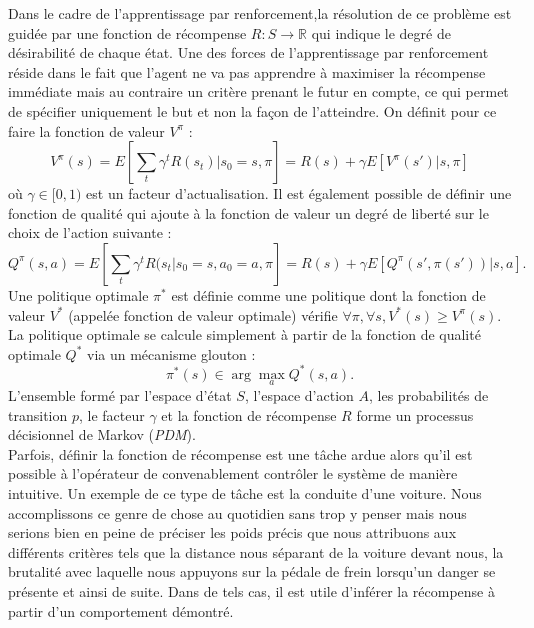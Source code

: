 \documentclass[publibook-draft]{CAp2012}
\begin{document}
Dans le cadre de l'apprentissage par renforcement,la résolution de ce problème est guidée par une fonction de récompense $R : S \rightarrow \mathbb{R}$ qui indique le degré de désirabilité de chaque état. Une des forces de l'apprentissage par renforcement réside dans le fait que l'agent ne va pas apprendre à maximiser la récompense immédiate mais au contraire un critère prenant le futur en compte, ce qui permet de spécifier uniquement le but et non la façon de l'atteindre. On définit pour ce faire la fonction de valeur $V^\pi$ :
\begin{equation}
\label{Vdef.eqn}
V^\pi(s) = E[\sum_t\gamma^tR(s_t)|s_0=s,\pi]=R(s) + \gamma E[V^\pi(s')|s,\pi]
\end{equation}
où $\gamma \in [0,1)$ est un facteur d'actualisation. Il est également possible de définir une fonction de qualité qui ajoute à la fonction de valeur un degré de liberté sur le choix de l'action suivante :
\begin{equation}
\label{Qdef.eqn}
Q^\pi(s,a) = E[\sum_t\gamma^tR(s_t|s_0=s,a_0=a,\pi] = R(s) + \gamma E[Q^\pi(s',\pi(s'))|s,a].
\end{equation}
  Une politique optimale $\pi^*$ est définie comme une politique dont la fonction de valeur $V^*$ (appelée fonction de valeur optimale) vérifie $\forall \pi, \forall s, V^*(s) \geq V^\pi(s)$. La politique optimale se calcule simplement à partir de la fonction de qualité optimale $Q^*$ via un mécanisme glouton :
\begin{equation}
\label{greedy.eqn}
\pi^*(s) \in \arg\max_a Q^*(s,a).
\end{equation}
L'ensemble formé par l'espace d'état $S$, l'espace d'action $A$, les probabilités de transition $p$, le facteur $\gamma$ et la fonction de récompense $R$ forme un processus décisionnel de Markov (\emph{PDM}).\\

Parfois, définir la fonction de récompense est une tâche ardue alors qu'il est possible à l'opérateur de convenablement contrôler le système de manière intuitive. Un exemple de ce type de tâche est la conduite d'une voiture. Nous accomplissons ce genre de chose au quotidien sans trop y penser mais nous serions bien en peine de préciser les poids précis que nous attribuons aux différents critères tels que la distance nous séparant de la voiture devant nous, la brutalité avec laquelle nous appuyons sur la pédale de frein lorsqu'un danger se présente et ainsi de suite. Dans de tels cas, il est utile d'inférer la récompense à partir d'un comportement démontré.\\
\end{document}
